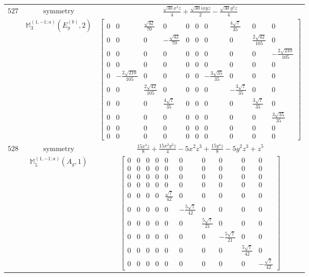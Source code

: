 \documentclass[fleqn,8pt,landscape]{jsarticle}
\begin{document}
\begin{longtable}{ccc}
$ 527 $ & $ \text{symmetry} $ & $ \frac{\sqrt{30} x^{2} z}{4} + \frac{\sqrt{30} i x y z}{2} - \frac{\sqrt{30} y^{2} z}{4} $ \\
$  $ & $ \mathbb{M}_{3}^{(1,-1;a)}(E_{g}^{(b)},2) $ & $ \begin{bmatrix} 0 & 0 & \frac{\sqrt{42}}{70} & 0 & 0 & 0 & 0 & \frac{4 \sqrt{7}}{35} & 0 & 0 \\ 0 & 0 & 0 & - \frac{\sqrt{42}}{70} & 0 & 0 & 0 & 0 & \frac{2 \sqrt{42}}{105} & 0 \\ 0 & 0 & 0 & 0 & 0 & 0 & 0 & 0 & 0 & - \frac{2 \sqrt{210}}{105} \\ 0 & 0 & 0 & 0 & 0 & 0 & 0 & 0 & 0 & 0 \\ 0 & - \frac{2 \sqrt{210}}{105} & 0 & 0 & 0 & 0 & - \frac{3 \sqrt{35}}{35} & 0 & 0 & 0 \\ 0 & 0 & \frac{2 \sqrt{42}}{105} & 0 & 0 & 0 & 0 & - \frac{3 \sqrt{7}}{35} & 0 & 0 \\ 0 & 0 & 0 & \frac{4 \sqrt{7}}{35} & 0 & 0 & 0 & 0 & \frac{3 \sqrt{7}}{35} & 0 \\ 0 & 0 & 0 & 0 & 0 & 0 & 0 & 0 & 0 & \frac{3 \sqrt{35}}{35} \\ 0 & 0 & 0 & 0 & 0 & 0 & 0 & 0 & 0 & 0 \\ 0 & 0 & 0 & 0 & 0 & 0 & 0 & 0 & 0 & 0 \end{bmatrix} $ \\ \hline
$ 528 $ & $ \text{symmetry} $ & $ \frac{15 x^{4} z}{8} + \frac{15 x^{2} y^{2} z}{4} - 5 x^{2} z^{3} + \frac{15 y^{4} z}{8} - 5 y^{2} z^{3} + z^{5} $ \\
$  $ & $ \mathbb{M}_{5}^{(1,-1;a)}(A_{g},1) $ & $ \begin{bmatrix} 0 & 0 & 0 & 0 & 0 & 0 & 0 & 0 & 0 & 0 \\ 0 & 0 & 0 & 0 & 0 & 0 & 0 & 0 & 0 & 0 \\ 0 & 0 & 0 & 0 & 0 & 0 & 0 & 0 & 0 & 0 \\ 0 & 0 & 0 & 0 & 0 & 0 & 0 & 0 & 0 & 0 \\ 0 & 0 & 0 & 0 & \frac{\sqrt{7}}{42} & 0 & 0 & 0 & 0 & 0 \\ 0 & 0 & 0 & 0 & 0 & - \frac{5 \sqrt{7}}{42} & 0 & 0 & 0 & 0 \\ 0 & 0 & 0 & 0 & 0 & 0 & \frac{5 \sqrt{7}}{21} & 0 & 0 & 0 \\ 0 & 0 & 0 & 0 & 0 & 0 & 0 & - \frac{5 \sqrt{7}}{21} & 0 & 0 \\ 0 & 0 & 0 & 0 & 0 & 0 & 0 & 0 & \frac{5 \sqrt{7}}{42} & 0 \\ 0 & 0 & 0 & 0 & 0 & 0 & 0 & 0 & 0 & - \frac{\sqrt{7}}{42} \end{bmatrix} $ \\ \hline

\end{longtable}
\end{document}
